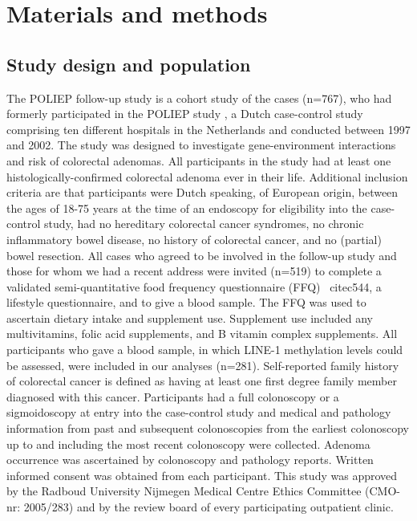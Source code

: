 \section{Materials and methods} %
\subsection{Study design and population} %
\noindent The POLIEP follow-up study is a cohort study of the cases (n=767), who had formerly participated in the POLIEP study \cite{c543}, a Dutch case-control study comprising ten different hospitals in the Netherlands and conducted between 1997 and 2002. The study was designed to investigate gene-environment interactions and risk of colorectal adenomas. All participants in the study had at least one histologically-confirmed colorectal adenoma ever in their life. Additional inclusion criteria are that participants were Dutch speaking, of European origin, between the ages of 18-75 years at the time of an endoscopy for eligibility into the case-control study, had no hereditary colorectal cancer syndromes, no chronic inflammatory bowel disease, no history of colorectal cancer, and no (partial) bowel resection. All cases who agreed to be involved in the follow-up study and those for whom we had a recent address were invited (n=519) to complete a validated semi-quantitative food frequency questionnaire (FFQ) \
cite{c544}, a lifestyle questionnaire, and to give a blood sample. The FFQ was used to ascertain dietary intake and supplement use. Supplement use included any multivitamins, folic acid supplements, and B vitamin complex supplements. All participants who gave a blood sample, in which LINE-1 methylation levels could be assessed, were included in our analyses (n=281). Self-reported family history of colorectal cancer is defined as having at least one first degree family member diagnosed with this cancer. Participants had a full colonoscopy or a sigmoidoscopy at entry into the case-control study and medical and pathology information from past and subsequent colonoscopies from the earliest colonoscopy up to and including the most recent colonoscopy were collected. Adenoma occurrence was ascertained by colonoscopy and pathology reports. Written informed consent was obtained from each participant. This study was approved by the Radboud University Nijmegen Medical Centre Ethics Committee (CMO-nr: 2005/283) and by 
the review board of every participating outpatient clinic.


